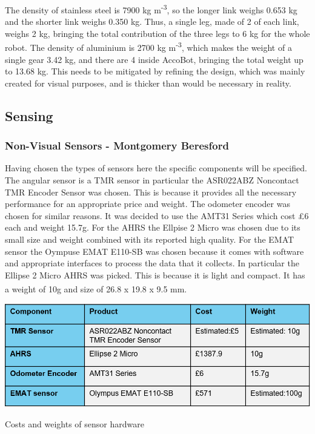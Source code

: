 \documentclass[11pt]{article}		%
\newcommand{\supercite}[1]{\textsuperscript{\cite{#1}}}		%
\begin{document}
			The density of stainless steel is 7900 kg m\textsuperscript{-3}\supercite{HLT}, so the longer link weighs 0.653 kg and the shorter link weighs 0.350 kg.
			Thus, a single leg, made of 2 of each link, weighs 2 kg, bringing the total contribution of the three legs to 6 kg for the whole robot.
			The density of aluminium is 2700 kg m\textsuperscript{-3}\supercite{HLT}, which makes the weight of a single gear 3.42 kg, and there are 4 inside AccoBot, bringing the total weight up to 13.68 kg.
			This needs to be mitigated by refining the design, which was mainly created for visual purposes, and is thicker than would be necessary in reality.
		
		\subsection[Sensing]{Sensing}
		\subsubsection{Non-Visual Sensors - Montgomery Beresford}
		Having chosen the types of sensors here the specific components will be specified. The angular sensor is a TMR sensor in particular the ASR022ABZ Noncontact TMR Encoder Sensor was chosen. This is because it provides all the necessary performance for an appropriate price and weight. The odometer encoder was chosen for similar reasons. It was decided to use the AMT31 Series which cost £6 each and weight 15.7g. For the AHRS the Ellpise 2 Micro was chosen due to its small size and weight combined with its reported high quality. For the EMAT sensor the Oympuse EMAT E110-SB was chosen because it comes with software and appropriate interfaces to process the data that it collects.
		In particular the Ellipse 2 Micro AHRS was picked.
            This is because it is light and compact. It has a weight of 10g and size of 26.8 x 19.8 x 9.5 mm. \supercite{Ellipse_Ahrs}
	  		\begin{table}[H]
	  		
	  		\centering
	  		\includegraphics[scale=0.7]{smaller component sensor table}
				\caption{Costs and weights of sensor hardware}
				\label{sensorHardware}
			\end{table}
\end{document}
